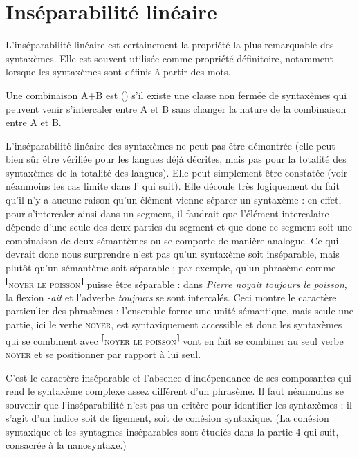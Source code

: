 \section{Inséparabilité linéaire}\label{sec:3.1.15}

L’inséparabilité linéaire est certainement la propriété la plus remarquable des syntaxèmes. Elle est souvent utilisée comme propriété définitoire, notamment lorsque les syntaxèmes sont définis à partir des mots.

\begin{styleLivreImportant}
Une combinaison A+B est ()  s’il existe une classe non fermée de syntaxèmes qui peuvent venir s’intercaler entre A et B sans changer la nature de la combinaison entre A et B.
\end{styleLivreImportant}

L’inséparabilité linéaire des syntaxèmes ne peut pas être démontrée (elle peut bien sûr être vérifiée pour les langues déjà décrites, mais pas pour la totalité des syntaxèmes de la totalité des langues). Elle peut simplement être constatée (voir néanmoins les cas limite dans l’ qui suit). Elle découle très logiquement du fait qu’il n’y a aucune raison qu’un élément vienne séparer un syntaxème : en effet, pour s’intercaler ainsi dans un segment, il faudrait que l’élément intercalaire dépende d’une seule des deux parties du segment et que donc ce segment soit une combinaison de deux sémantèmes ou se comporte de manière analogue. Ce qui devrait donc nous surprendre n’est pas qu’un syntaxème soit inséparable, mais plutôt qu’un sémantème soit séparable ; par exemple, qu’un phrasème comme \textsuperscript{⌈}\textsc{noyer} \textsc{le} \textsc{poisson}\textsuperscript{⌉} puisse être séparable : dans \textit{Pierre noyait toujours le poisson}, la flexion \textit{{}-ait} et l’adverbe \textit{toujours} se sont intercalés. Ceci montre le caractère particulier des phrasèmes : l’ensemble forme une unité sémantique, mais seule une partie, ici le verbe \textsc{noyer}, est syntaxiquement accessible et donc les syntaxèmes qui se combinent avec \textsuperscript{⌈}\textsc{noyer} \textsc{le} \textsc{poisson}\textsuperscript{⌉} vont en fait se combiner au seul verbe \textsc{noyer} et se positionner par rapport à lui seul.

C’est le caractère inséparable et l’absence d’indépendance de ses composantes qui rend le syntaxème complexe assez différent d’un phrasème. Il faut néanmoins se souvenir que l’inséparabilité n’est pas un critère pour identifier les syntaxèmes : il s’agit d’un indice soit de figement, soit de cohésion syntaxique. (La cohésion syntaxique et les syntagmes inséparables sont étudiés dans la partie 4 qui suit, consacrée à la nanosyntaxe.)

